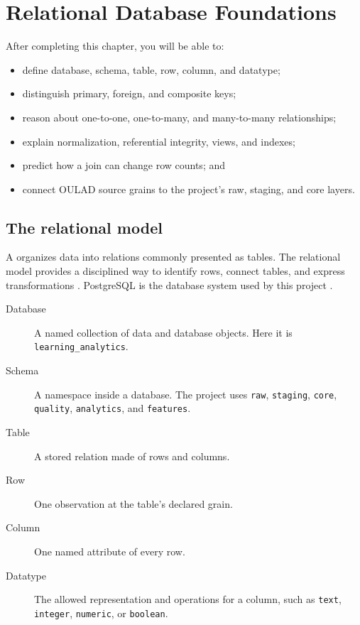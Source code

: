\chapter{Relational Database Foundations}
\label{ch:relational-foundations}

\begin{learningobjectives}
After completing this chapter, you will be able to:
\begin{itemize}
  \item define database, schema, table, row, column, and datatype;
  \item distinguish primary, foreign, and composite keys;
  \item reason about one-to-one, one-to-many, and many-to-many relationships;
  \item explain normalization, referential integrity, views, and indexes;
  \item predict how a join can change row counts; and
  \item connect OULAD source grains to the project's raw, staging, and core
    layers.
\end{itemize}
\end{learningobjectives}

\section{The relational model}

A  organizes data into relations commonly presented
as tables. The relational model provides a disciplined way to identify rows,
connect tables, and express transformations \citep{codd1970}. PostgreSQL is the
database system used by this project \citep{postgres16}.

\begin{description}
  \item[Database] A named collection of data and database objects. Here it is
    \texttt{learning\_analytics}.
  \item[Schema] A namespace inside a database. The project uses
    \texttt{raw}, \texttt{staging}, \texttt{core}, \texttt{quality},
    \texttt{analytics}, and \texttt{features}.
  \item[Table] A stored relation made of rows and columns.
  \item[Row] One observation at the table's declared grain.
  \item[Column] One named attribute of every row.
  \item[Datatype] The allowed representation and operations for a column, such
    as \texttt{text}, \texttt{integer}, \texttt{numeric}, or \texttt{boolean}.
\end{description}

